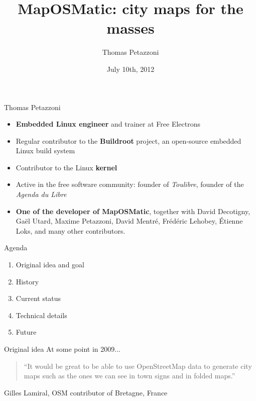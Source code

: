 \documentclass{beamer}
\title{MapOSMatic: city maps for the masses}
\author{Thomas {\sc Petazzoni}}
\institute{Libre Software Meeting}
\date{July 10th, 2012}
\begin{document}

\begin{frame}
  \titlepage
\end{frame}

\begin{frame}{Thomas Petazzoni}
  \begin{itemize}
  \item {\bf Embedded Linux engineer} and trainer at Free Electrons
  \item Regular contributor to the {\bf Buildroot} project, an open-source
    embedded Linux build system
  \item Contributor to the Linux {\bf kernel}
  \item Active in the free software community: founder of {\em
      Toulibre}, founder of the {\em Agenda du Libre}
  \item {\bf One of the developer of MapOSMatic}, together with
    David Decotigny, Gaël Utard, Maxime Petazzoni, David Mentré,
    Frédéric Lehobey, Étienne Loks, and many other contributors.
  \end{itemize}
\end{frame}

\begin{frame}{Agenda}
  \begin{enumerate}
  \item Original idea and goal
  \item History
  \item Current status
  \item Technical details
  \item Future
  \end{enumerate}
\end{frame}

\begin{frame}{Original idea}
  At some point in 2009...
  \vspace{1cm}
  \\
  \Large
  \begin{quote}
    ``It would be great to be able to use OpenStreetMap data to generate
    city maps such as the ones we can see in town signs and in folded
    maps.''
  \end{quote}
  \normalsize
  \vspace{1cm}
  \hfill Gilles Lamiral, OSM contributor of Bretagne, France
\end{frame}
\end{document}
